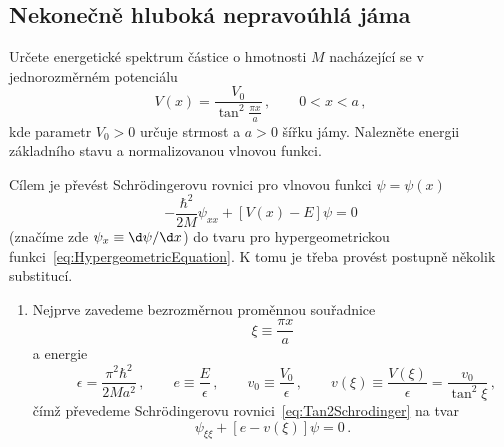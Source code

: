 \subsection{Nekonečně hluboká nepravoúhlá jáma}
Určete energetické spektrum částice o hmotnosti $M$ nacházející se v jednorozměrném potenciálu
\begin{equation}
	V(x)=\frac{V_{0}}{\tan^{2}\frac{\pi x}{a}}\,,\qquad 0<x<a\,,
\end{equation}
kde parametr $V_{0}>0$ určuje strmost a $a>0$ šířku jámy.
Nalezněte energii základního stavu a normalizovanou vlnovou funkci.

\begin{solution}
	Cílem je převést Schrödingerovu rovnici pro vlnovou funkci $\psi=\psi(x)$
	\begin{equation}
		\label{eq:Tan2Schrodinger}
		-\frac{\hbar^{2}}{2M}\psi_{xx}+\left[V(x)-E\right]\psi=0
	\end{equation}
	(značíme zde $\psi_{x}\equiv\d\psi/\d x$) do tvaru pro hypergeometrickou funkci~\eqref{eq:HypergeometricEquation}.
	K tomu je třeba provést postupně několik substitucí.
	
	\begin{enumerate}
	\item
		Nejprve zavedeme bezrozměrnou proměnnou souřadnice
		\begin{equation}
			\label{eq:Tan2Xi}
			\xi\equiv\frac{\pi x}{a}
		\end{equation}
		a energie
		\begin{equation}
			\label{eq:Tan2Energy}
			\qquad\epsilon=\frac{\pi^{2}\hbar^{2}}{2Ma^{2}}\,,
			\qquad e\equiv\frac{E}{\epsilon}\,,
			\qquad v_{0}\equiv\frac{V_{0}}{\epsilon}\,,
			\qquad v(\xi)\equiv\frac{V(\xi)}{\epsilon}=\frac{v_{0}}{\tan^{2}\xi}\,,
		\end{equation}		
		čímž převedeme Schrödingerovu rovnici~\eqref{eq:Tan2Schrodinger} na tvar
		\begin{equation}
			\label{eq:Tan2SchrodingerXi}
			\psi_{\xi\xi}+\left[e-v(\xi)\right]\psi=0\,.
		\end{equation}
	

\end{enumerate}
\end{solution}
